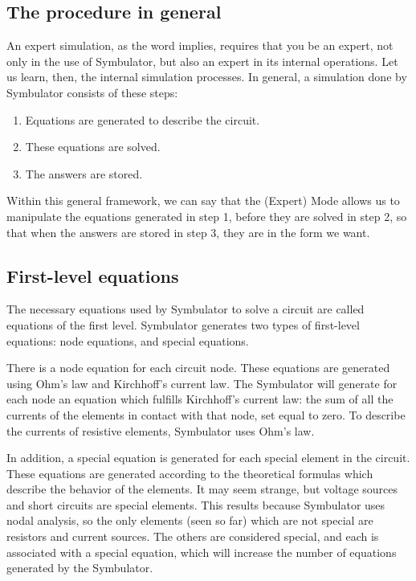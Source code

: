 \subsection{The procedure in general}

An expert simulation, as the word implies, requires that you be an
expert, not only in the use of Symbulator, but also an expert in its
internal operations. Let us learn, then, the internal simulation
processes. In general, a simulation done by Symbulator consists of
these steps:

\begin{enumerate}
\item Equations are generated to describe the circuit.
\item These equations are solved.
\item The answers are stored.
\end{enumerate}

Within this general framework, we can say that the (Expert) Mode
allows us to manipulate the equations generated in step 1, before
they are solved in step 2, so that when the answers are stored in
step 3, they are in the form we want.

\subsection{First-level equations}

The necessary equations used by Symbulator to solve a circuit are
called equations of the first level. Symbulator generates two types
of first-level equations: node equations, and special equations.

There is a node equation for each circuit node. These equations are
generated using Ohm's law and Kirchhoff's current law. The
Symbulator will generate for each node an equation which fulfills
Kirchhoff's current law: the sum of all the currents of the elements
in contact with that node, set equal to zero. To describe the
currents of resistive elements, Symbulator uses Ohm's law.

In addition, a special equation is generated for each special
element in the circuit. These equations are generated according to
the theoretical formulas which describe the behavior of the
elements. It may seem strange, but voltage sources and short
circuits are special elements. This results because Symbulator uses
nodal analysis, so the only elements (seen so far) which are not
special are resistors and current sources. The others are considered
special, and each is associated with a special equation, which will
increase the number of equations generated by the Symbulator.

